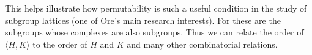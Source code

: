 \documentclass[12pt]{article}
\begin{document}
This helps illustrate how permutability is such a useful condition in the study of subgroup lattices (one of Ore's main research interests).  For these are the subgroups whose complexes are also subgroups.  Thus we can relate the order of $\langle H,K\rangle$ to the order of $H$ and $K$ and many other combinatorial relations.

\end{document}
